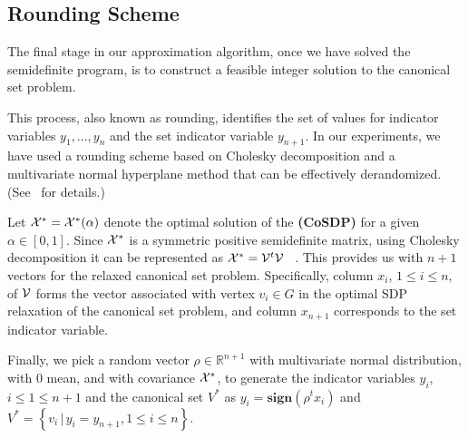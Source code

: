 \documentclass{ieee}
\def\V{{\cal V}}
\def\X{{\cal X}}
\def\SR{{\mathbb{R}}}
\begin{document}
\vspace{-0.1in}
\subsection{Rounding Scheme}
\label{sec:rounding}
\vspace{-0.1in}
The final stage in our approximation algorithm, once we have solved
the semidefinite program, is to construct a feasible integer solution
to the canonical set problem.

This process, also known as rounding, identifies the set of values for
indicator variables $y_1,...,y_n$ and the set indicator variable
$y_{n+1}$.  In our experiments, we have used a rounding scheme based
on Cholesky decomposition and a multivariate normal hyperplane method
that can be effectively derandomized.
(See~\cite{mahajan99derandomizing} for details.)

Let $\X^*=\X^*(\alpha)$ denote the optimal solution of the
\textbf{(CoSDP)} for a given $\alpha\in[0,1]$.  Since $\X^*$ is a
symmetric positive semidefinite matrix, using Cholesky decomposition
it can be represented as $\X^*=\V^t\V$ ~\cite{Golub96}. This provides
us with $n+1$ vectors for the relaxed canonical set problem.
Specifically, column $x_i$, $1\le i\le n$, of $\V$ forms the vector
associated with vertex $v_i\in G$ in the optimal SDP relaxation of the
canonical set problem, and column $x_{n+1}$ corresponds to the set
indicator variable.
 
Finally, we pick a random vector $\rho\in\SR^{n+1}$ with multivariate
normal distribution, with $0$ mean, and with covariance $\X^*$, to
generate the indicator variables $y_i$, $i\le 1\le n+1$ and the
canonical set $V^*$ as $ y_i=\textbf{sign}\left (\rho^tx_i\right ) $
and $ V^*=\left\{v_i\,|\,y_i=y_{n+1}, 1\le i\le n \right\}.  $
\end{document}
